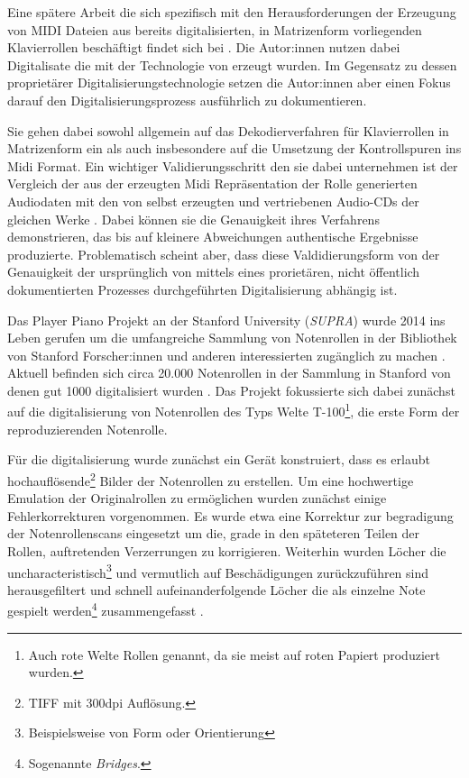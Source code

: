 Eine spätere Arbeit die sich spezifisch mit den Herausforderungen der Erzeugung von MIDI Dateien aus bereits digitalisierten, in Matrizenform vorliegenden Klavierrollen beschäftigt findet sich bei \textcite[]{colmenares_2011}.
Die Autor:innen nutzen dabei Digitalisate die mit der Technologie von \textcite[]{stahnke_1996} erzeugt wurden.
Im Gegensatz zu dessen proprietärer Digitalisierungstechnologie setzen die Autor:innen aber einen Fokus darauf den Digitalisierungsprozess ausführlich zu dokumentieren.

Sie gehen dabei sowohl allgemein auf das Dekodierverfahren für Klavierrollen in Matrizenform ein als auch insbesondere auf die Umsetzung der Kontrollspuren ins Midi Format.
Ein wichtiger Validierungsschritt den sie dabei unternehmen ist der Vergleich der aus der erzeugten Midi Repräsentation der Rolle generierten Audiodaten mit den von \textcite[]{stahnke_1996} selbst erzeugten und vertriebenen Audio-CDs der gleichen Werke \parencite[70ff]{colmenares_2011}.
Dabei können sie die Genauigkeit ihres Verfahrens demonstrieren, das bis auf kleinere Abweichungen authentische Ergebnisse produzierte.
Problematisch scheint aber, dass diese Valdidierungsform von der Genauigkeit der ursprünglich von \textcite[]{stahnke_1996} mittels eines prorietären, nicht öffentlich dokumentierten Prozesses durchgeführten Digitalisierung abhängig ist.



Das Player Piano Projekt an der Stanford University (\textit{SUPRA}) wurde 2014 ins Leben gerufen um die umfangreiche Sammlung von Notenrollen in der Bibliothek von Stanford Forscher:innen und anderen interessierten zugänglich zu machen \autocite[]{shi_2019}.
Aktuell befinden sich circa 20.000 Notenrollen in der Sammlung in Stanford von denen gut 1000 digitalisiert wurden \autocite[]{broadwell_2022}.
Das Projekt fokussierte sich dabei zunächst auf die digitalisierung von Notenrollen des Typs Welte T-100\footnote{Auch rote Welte Rollen genannt, da sie meist auf roten Papiert produziert wurden.}, die erste Form der reproduzierenden Notenrolle.

Für die digitalisierung wurde zunächst ein Gerät konstruiert, dass es erlaubt hochauflösende\footnote{TIFF mit 300dpi Auflösung.} Bilder der Notenrollen zu erstellen.
Um eine hochwertige Emulation der Originalrollen zu ermöglichen wurden zunächst einige Fehlerkorrekturen vorgenommen.
Es wurde etwa eine Korrektur zur begradigung der Notenrollenscans eingesetzt um die, grade in den späteteren Teilen der Rollen, auftretenden Verzerrungen zu korrigieren.
Weiterhin wurden Löcher die uncharacteristisch\footnote{Beispielsweise von Form oder Orientierung} und vermutlich auf Beschädigungen zurückzuführen sind herausgefiltert und schnell aufeinanderfolgende Löcher die als einzelne Note gespielt werden\footnote{Sogenannte \textit{Bridges}.} zusammengefasst \autocite[519f]{shi_2019}.


